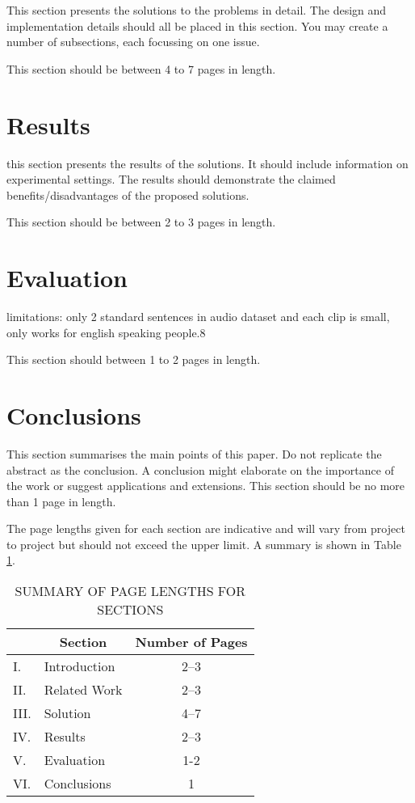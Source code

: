 \documentclass[12pt,a4paper]{article}
\begin{document}
This section presents the solutions to the problems in detail.  The design and implementation details should all be placed in this section.  You may create a number of subsections, each focussing on one issue.  

This section should be between 4 to 7 pages in length.

\section{Results}

this section presents the results of the solutions.  It should include information on experimental settings.  The results should demonstrate the claimed benefits/disadvantages of the proposed solutions.

This section should be between 2 to 3 pages in length.

\section{Evaluation}
limitations: only 2 standard sentences in audio dataset and each clip is small, only works for english speaking people.8

This section should between 1 to 2 pages in length.

\section{Conclusions}

This section summarises the main points of this paper.  Do not replicate the abstract as the conclusion.  A conclusion might elaborate on the importance of the work or suggest applications and extensions.  This section should be no more than 1 page in length.

The page lengths given for each section are indicative and will vary from project to project but should not exceed the upper limit.  A summary is shown in Table \ref{summary}.

\begin{table}[htb]
	\centering
	\caption{SUMMARY OF PAGE LENGTHS FOR SECTIONS}
	\vspace*{6pt}
	\label{summary}
	\begin{tabular}{|ll|c|} \hline
		& \multicolumn{1}{c|}{\bf Section} & {\bf Number of Pages} \\ \hline
		I. & Introduction & 2--3 \\ \hline
		II. & Related Work & 2--3 \\ \hline
		III. & Solution & 4--7 \\ \hline
		IV. & Results & 2--3 \\ \hline
		V. & Evaluation & 1-2 \\ \hline
		VI. & Conclusions & 1 \\ \hline
	\end{tabular}
\end{table}



\end{document}
